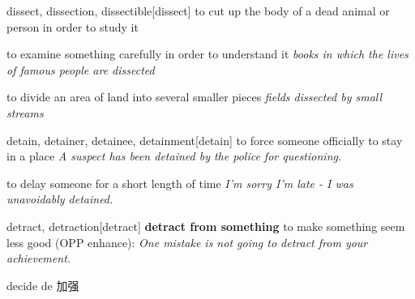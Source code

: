 \begin{word}{dissect, dissection, dissectible}[dissect]
    to cut up the body of a dead animal or person in order to study it

    to examine something carefully in order to understand it
    \textit{books in which the lives of famous people are dissected}

    to divide an area of land into several smaller pieces
    \textit{fields dissected by small streams}
\end{word}

\begin{word}{detain, detainer, detainee, detainment}[detain]
    to force someone officially to stay in a place
    \textit{A suspect has been detained by the police for questioning.}

    to delay someone for a short length of time
\textit{I'm sorry I'm late - I was unavoidably detained.}
\end{word}

\begin{word}{detract, detraction}[detract]
    \textbf{detract from something}
    to make something seem less good (OPP  enhance):
    \textit{One mistake is not going to detract from your achievement.}
\end{word}

\begin{word}{decide}
    de 加强
\end{word}